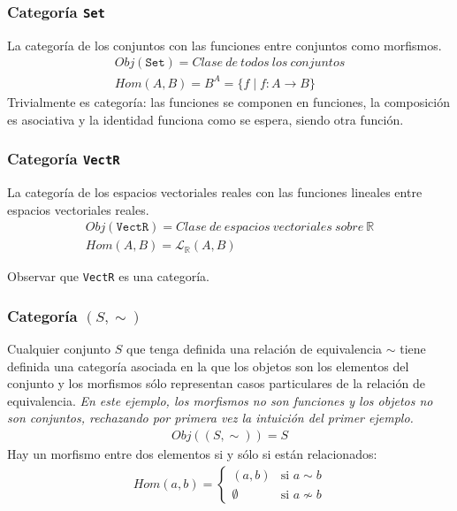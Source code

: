 \documentclass[11pt, fleqn, spanish]{book}
\newcommand{\twopartdef}[4]
{
	\left\{
		\begin{array}{ll}
			#1 & \mbox{si } #2 \\
			#3 & \mbox{si } #4
		\end{array}
	\right.
}
\begin{document}
    \subsubsection{Categoría \texttt{Set}}
      La categoría de los conjuntos con las funciones entre conjuntos como morfismos.
      \begin{gather*}
        Obj(\texttt{Set}) = Clase\ de\ todos\ los\ conjuntos \\
        Hom(A,B)= B^A = \{f \;|\; f: A \rightarrow B \}
      \end{gather*}
      Trivialmente es categoría: las funciones se componen en funciones, la composición es
      asociativa y la identidad funciona como se espera, siendo otra función.
      
    \subsubsection{Categoría \texttt{VectR}}
      La categoría de los espacios vectoriales reales con las funciones lineales entre
      espacios vectoriales reales.
      \begin{gather*}
        Obj(\texttt{VectR}) = Clase\ de\ espacios\ vectoriales\ sobre\ \mathbb{R} \\
        Hom(A,B)= \mathcal{L}_{\mathbb{R}}(A,B)
      \end{gather*}
      \begin{exercise} 
	Observar que \texttt{VectR} es una categoría.
      \end{exercise}

    
    \subsubsection{Categoría \texttt{$(S,\sim)$}}
      Cualquier conjunto $S$ que tenga definida una relación de equivalencia $\sim$ tiene
      definida una categoría asociada en la que los objetos son los elementos del conjunto
      y los morfismos sólo representan casos particulares de la relación de equivalencia.
      \textit{En este ejemplo, los morfismos no son funciones y los objetos no son conjuntos,
      rechazando por primera vez la intuición del primer ejemplo.}
      \begin{gather*}
        Obj((S,\sim)) = S
      \end{gather*}
      Hay un morfismo entre dos elementos si y sólo si están relacionados:
      \begin{align*}
        Hom(a,b)= \twopartdef{(a,b)}{a \sim b}{\emptyset}{a \nsim b}
      \end{align*}
      
\end{document}
